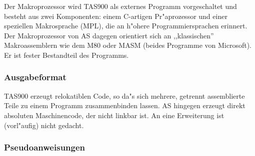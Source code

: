 \documentclass[12pt,a4paper,twoside]{report}
\newcommand{\asname}{AS}
\begin{document}
Der Makroprozessor wird TAS900 als externes Programm vorgeschaltet und
besteht aus zwei Komponenten: einem C-artigen Pr"aprozessor und einer
speziellen Makrosprache (MPL), die an h"ohere Programmiersprachen
erinnert.  Der Makroprozessor von \asname{} dagegen orientiert sich an
,,klassischen'' Makroassemblern wie dem M80 oder MASM (beides Programme
von Microsoft).  Er ist fester Bestandteil des Programms.

\subsubsection{Ausgabeformat}

TAS900 erzeugt relokatiblen Code, so da"s sich mehrere, getrennt assemblierte
Teile zu einem Programm zusammenbinden lassen.  \asname{} hingegen erzeugt direkt
absoluten Maschinencode, der nicht linkbar ist.  An eine Erweiterung ist
(vorl"aufig) nicht gedacht.

\subsubsection{Pseudoanweisungen}
\end{document}
